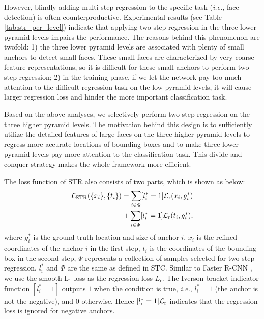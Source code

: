 \documentclass[letterpaper]{article} \usepackage{aaai19m}  \usepackage{times}  \usepackage{helvet}  \usepackage{courier}  \usepackage{url}  \usepackage{graphicx}  \usepackage{subfigure}
\def\ie{{\em i.e.}}
\begin{document}
However, blindly adding multi-step regression to the specific task (\ie, face detection) is often counterproductive. Experimental results (see Table \ref{tab:str_per_level}) indicate that applying two-step regression in the three lower pyramid levels impairs the performance. The reasons behind this phenomenon are twofold: 1) the three lower pyramid levels are associated with plenty of small anchors to detect small faces. These small faces are characterized by very coarse feature representations, so it is difficult for these small anchors to perform two-step regression; 2) in the training phase, if we let the network pay too much attention to the difficult regression task on the low pyramid levels, it will cause larger regression loss and hinder the more important classification task. 

Based on the above analyses, we selectively perform two-step regression on the three higher pyramid levels. The motivation behind this design is to sufficiently utilize the detailed features of large faces on the three higher pyramid levels to regress more accurate locations of bounding boxes and to make three lower pyramid levels pay more attention to the classification task. This divide-and-conquer strategy makes the whole framework more efficient.

The loss function of STR also consists of two parts, which is shown as below:
\begin{equation}
\begin{aligned}
{\cal L}_\text{STR}(\{x_i\},\{t_i\})=\sum_{i\in \Psi}[l_i^\ast=1]{\cal L}_{\text{r}}(x_i, g_i^\ast) \\
+ \sum_{i\in \Phi}[l_i^\ast=1]{\cal L}_{\text{r}}(t_i, g_i^\ast),
\end{aligned}
\label{1}
\end{equation}
where $g_i^\ast$ is the ground truth location and size of anchor $i$, $x_i$ is the refined coordinates of the anchor $i$ in the first step, $t_i$ is the coordinates of the bounding box in the second step, $\Psi$ represents a collection of samples selected for two-step regression, $l_i^\ast$ and $\Phi$ are the same as defined in STC. Similar to Faster R-CNN \cite{DBLP:journals/pami/RenHG017}, we use the smooth L$_1$ loss as the regression loss $L_{\text{r}}$. The Iverson bracket indicator function $[l_i^\ast=1]$ outputs $1$ when the condition is true, \ie, $l_i^\ast=1$ (the anchor is not the negative), and $0$ otherwise. Hence $[l_i^\ast=1]{\cal L}_{\text{r}}$ indicates that the regression loss is ignored for negative anchors.
\end{document}

